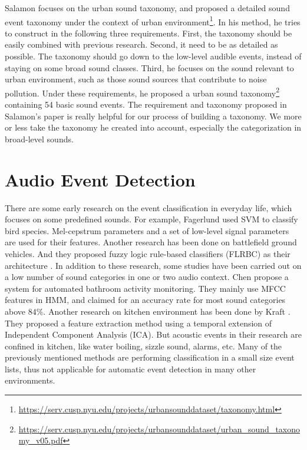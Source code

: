 Salamon \et \cite{salamon2014dataset} focuses on the urban sound taxonomy, and proposed a detailed sound event taxonomy under the context of urban environment\footnote{\url{https://serv.cusp.nyu.edu/projects/urbansounddataset/taxonomy.html}}. 
In his method, he tries to construct in the following three requirements. 
First, the taxonomy should be easily combined with previous research.
Second, it need to be as detailed as possible. 
The taxonomy should go down to the low-level audible events, instead of staying on some broad sound classes. 
Third, he focuses on the sound relevant to urban environment, such as those sound sources that contribute to noise pollution. 
Under these requirements, he proposed a urban sound taxonomy\footnote{\url{https://serv.cusp.nyu.edu/projects/urbansounddataset/urban\_sound\_taxonomy\_v05.pdf}} containing 54 basic sound events. 
The requirement and taxonomy proposed in Salamon's paper is really helpful for our process of building a taxonomy. 
We more or less take the taxonomy he created into account, especially the categorization in broad-level sounds. 

\section{Audio Event Detection}
There are some early research on the event classification in everyday life, which focuses on some predefined sounds. 
For example, Fagerlund \et \cite{fagerlund2007bird} used SVM to classify bird species. 
Mel-cepstrum parameters and a set of low-level signal parameters are used for their features. 
Another research has been done on battlefield ground vehicles. And they proposed fuzzy logic rule-based classifiers (FLRBC) as their architecture \cite{wu2007classification}. 
In addition to these research, some studies have been carried out on a low number of sound categories in one or two audio context. 
Chen \et \cite{chen2005bathroom} propose a system for automated bathroom activity monitoring. 
They mainly use MFCC features in HMM, and claimed for an accuracy rate for most sound categories above $84\%$. 
Another research on kitchen environment has been done by Kraft \cite{kraft2005temporal}. 
They proposed a feature extraction method using a temporal extension of Independent Component Analysis (ICA). 
But acoustic events in their research are confined in kitchen, like water boiling, sizzle sound, alarms, etc. 
Many of the previously mentioned methods are performing classification in a small size event lists, thus not applicable for automatic event detection in many other environments. 
 
